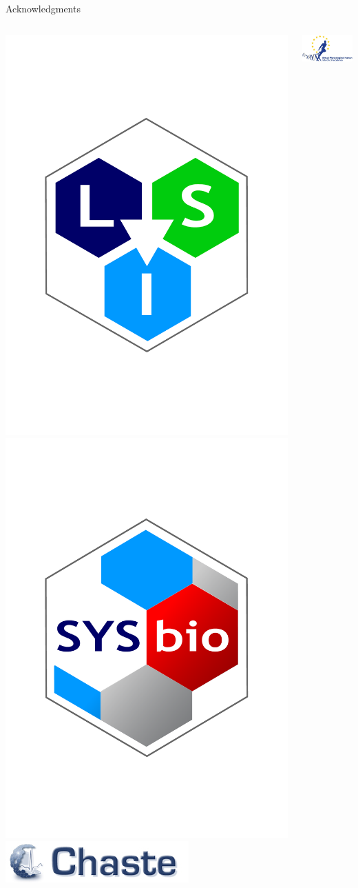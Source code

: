 \documentclass[t,xcolor={usenames,dvipsnames}]{beamer}
\begin{document}
\begin{frame}{Acknowledgments}
\begin{columns}[T]
\begin{column}{.5\linewidth}
\begin{center}
\includegraphics[width=.3\textwidth]{LSI_hexagon_150mm}
\includegraphics[width=.3\textwidth]{SYSBIO_hexagon_150mm}\\ \vspace{.2cm}
\includegraphics[width=.9\textwidth]{chaste-266x60}
\end{center}
\end{column}
\begin{column}{.5\linewidth}
\begin{center}
\vspace{-1cm}
\includegraphics[width=.8\textwidth]{vph_noe_logo}\\

\end{center}
\end{column}
\end{columns}
\end{frame}
\end{document}
